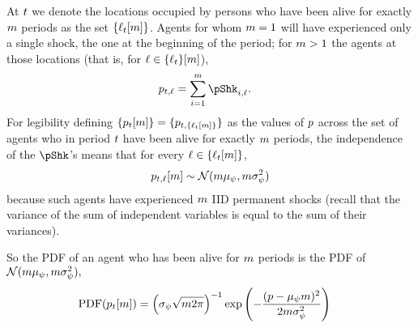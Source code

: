 \documentclass[\econtexRoot/BufferStockTheory.tex]{subfiles}
\begin{document}
At ${}t$ we denote the locations occupied by persons who have been alive for exactly $m$ periods as the set $\{\ell_{{}t}[m]\}$. Agents for whom $m=1$ will have experienced only a single shock, the one at the beginning of the period; for $m>1$ the agents at those locations (that is, for $\ell \in \{\ell_{{}t}\}[m]$),
\begin{align}
  \pLog_{{\tp}\FutPer,\posn}  & = \sum_{\NewPer=1}^{\LooPer}\pShk_{{\tp}\NewPer,\posn}.
\end{align}
For legibility defining $\{p_{{}t}[m]\} = \{p_{{}t,\{\ell_{{}t}[m]\}}\}$ as the values of $p$ across the set of agents who in period ${}t$ have been alive for exactly $m$ periods, the independence of the $\pShk$'s means that for every $\ell \in \{\ell_{t}[m]\}$,
\begin{align}
  p_{t,\ell}[m] \sim \mathcal{N}(m \mu_{\psi},m \sigma^{2}_{\psi}) \label{eq:dstpnm}
\end{align}
because such agents have experienced $m$ IID permanent shocks (recall that the variance of the sum of independent variables is equal to the sum of their variances).


\newcommand{\PDF}{\textrm{PDF}}
So the PDF of an agent who has been alive for $m$ periods is the PDF of $\mathcal{N}(m \mu_{\psi},m \sigma^{2}_{\psi}),$
\begin{align}
  \PDF(\pLog_{\FutPer}[\LooPer]) & = \left(
                                   {\sigma_{\DnsShk}\sqrt{\LooPer 2 \pi}}\right)^{-1} \exp\left(-\frac{(\pLog- \pShkMean \LooPer )^{2}}{2 \LooPer \sigma^{2}_{\DnsShk}}\right)
\end{align}
\end{document}
